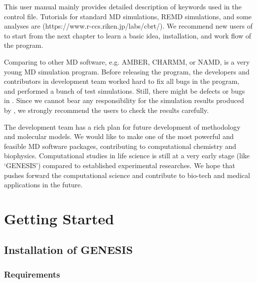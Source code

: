 \documentclass[a4paper,11pt,oneside,english]{sphinxmanual}
\begin{document}
This user manual mainly provides detailed description of
keywords used in the control file. Tutorials for standard MD
simulations, REMD simulations, and some analyses are
 (https://www.r-ccs.riken.jp/labs/cbrt/).
We recommend new users of  to start from
the next chapter to learn a basic idea, installation, and work flow of the program.

Comparing to other MD software, e.g. AMBER, CHARMM, or NAMD,
 is a very young MD simulation program. Before releasing the
program, the developers and contributors in  development team
worked hard to fix all bugs in the program, and performed a bunch of
test simulations. Still, there might be defects or bugs in
. Since we cannot bear any responsibility for the
simulation results produced by , we strongly recommend
the users to check the results carefully.

The  development team has a rich plan for future development
of methodology and molecular models. We would like to
make  one of the most powerful and feasible MD software packages,
contributing to computational chemistry and biophysics. Computational
studies in life science is still at a very early stage (like
‘GENESIS’) compared to established experimental researches. We hope
that  pushes forward the computational science and
contribute to bio-tech and medical applications in the future.


\chapter{Getting Started}
\label{\detokenize{01_Getting_Started:getting-started}}\label{\detokenize{01_Getting_Started:id1}}\label{\detokenize{01_Getting_Started::doc}}

\section{Installation of GENESIS}
\label{\detokenize{01_Getting_Started:installation-of-genesis}}

\subsection{Requirements}
\label{\detokenize{01_Getting_Started:requirements}}
\end{document}
